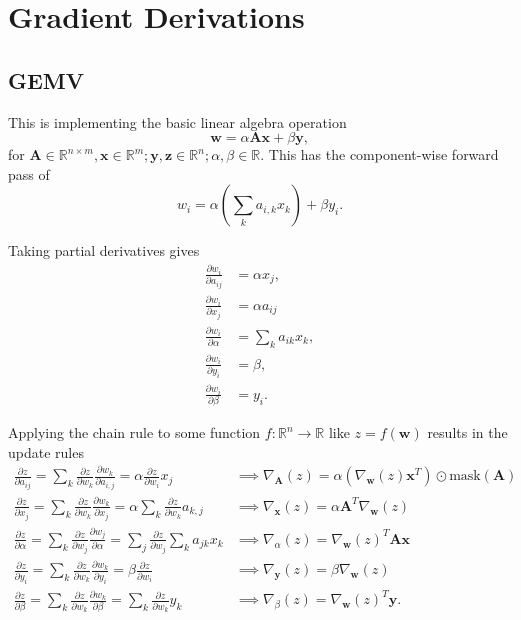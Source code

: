 \documentclass{article}
\newcommand{\mat}[1]{\bm{{#1}}}
\renewcommand{\vec}[1]{\bm{{#1}}}
\newcommand{\grad}{\nabla}
\newcommand{\mask}[1]{\text{mask}\left( {#1} \right)}
\newcommand{\gradfn}[2]{\nabla_{{#1}}\left({#2}\right)} %
\theoremstyle{definition}
\begin{document}
\section{Gradient Derivations}
\subsection{GEMV}
This is implementing the basic linear algebra operation
\begin{equation}
  \vec{w} = \alpha \mat{A}\vec{x} + \beta \vec{y},
\end{equation}
for $\mat{A} \in \mathbb{R}^{n \times m}, \vec{x} \in \mathbb{R}^m; \vec{y}, \vec{z} \in \mathbb{R}^n; \alpha, \beta \in \mathbb{R}$.  This has the component-wise forward pass of
\begin{equation}
  w_i = \alpha\left(\sum_k a_{i,k} x_k\right) + \beta y_i.
\end{equation}

Taking partial derivatives gives
\begin{align}
  \frac{\partial w_i}{\partial a_{ij}} &= \alpha x_j, \\
  \frac{\partial w_i}{\partial x_j} &= \alpha a_{ij} \\
  \frac{\partial w_i}{\partial \alpha} &= \sum_k a_{ik} x_k, \\
  \frac{\partial w_i}{\partial y_i} &= \beta, \\
  \frac{\partial w_i}{\partial \beta} &= y_i.
\end{align}

Applying the chain rule to some function $f : \mathbb{R}^n \to \mathbb{R}$ like $z=f\left(\vec{w}\right)$ results in the update rules
\begin{align}
  \frac{\partial z}{\partial a_{ij}} = \sum_k \frac{\partial z}{\partial w_k} \frac{\partial w_k}{\partial a_{i,j}} = \alpha \frac{\partial z}{\partial w_i} x_j &\implies \gradfn{\mat{A}}{z} = \alpha\left(\gradfn{\vec{w}}{z} \vec{x}^T\right) \odot \mask{\mat{A}} \\
  \frac{\partial z}{\partial x_j} = \sum_k \frac{\partial z}{\partial w_k} \frac{\partial w_k}{\partial x_j} = \alpha \sum_k \frac{\partial z}{\partial w_k} a_{k, j} &\implies \gradfn{\vec{x}}{z} = \alpha \mat{A}^T \grad_{\vec{w}}\left(z\right) \\
  \frac{\partial z}{\partial \alpha} = \sum_k \frac{\partial z}{\partial w_j} \frac{\partial w_j}{\partial \alpha} = \sum_j \frac{\partial z}{\partial w_j} \sum_k a_{jk} x_k &\implies \gradfn{\alpha}{z} = \gradfn{\vec{w}}{z}^T \mat{A} \vec{x} \\
  \frac{\partial z}{\partial y_i} = \sum_k \frac{\partial z}{\partial w_k} \frac{\partial w_k}{\partial y_i} = \beta \frac{\partial z}{\partial w_i} &\implies \gradfn{\vec{y}}{z} = \beta \gradfn{\vec{w}}{z} \\
  \frac{\partial z}{\partial \beta} = \sum_k \frac{\partial z}{\partial w_k} \frac{\partial w_k}{\partial \beta} = \sum_k \frac{\partial z}{\partial w_k} y_k &\implies \gradfn{\beta}{z} = \gradfn{\vec{w}}{z}^T \vec{y}.
\end{align}
\end{document}
